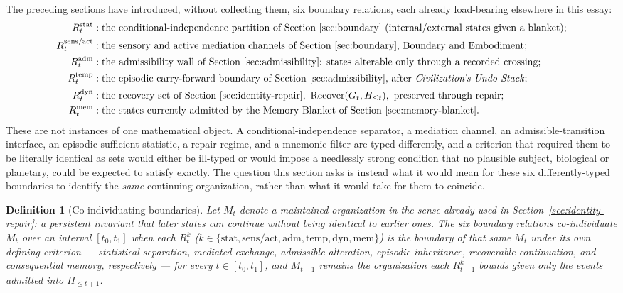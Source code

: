 \documentclass[11pt]{article}
\newcommand{\Recover}{\operatorname{Recover}}
\newtheorem{definition}{Definition}
\begin{document}
The preceding sections have introduced, without collecting them, six boundary relations, each already load-bearing elsewhere in this essay:
\begin{align*}
R^{\mathrm{stat}}_t &: \text{the conditional-independence partition of Section~\ref{sec:boundary} (internal/external states given a blanket);}\\
R^{\mathrm{sens/act}}_t &: \text{the sensory and active mediation channels of Section~\ref{sec:boundary}, Boundary and Embodiment;}\\
R^{\mathrm{adm}}_t &: \text{the admissibility wall of Section~\ref{sec:admissibility}: states alterable only through a recorded crossing;}\\
R^{\mathrm{temp}}_t &: \text{the episodic carry-forward boundary of Section~\ref{sec:admissibility}, after \emph{Civilization's Undo Stack};}\\
R^{\mathrm{dyn}}_t &: \text{the recovery set of Section~\ref{sec:identity-repair}, } \Recover(G_t,H_{\leq t}), \text{ preserved through repair;}\\
R^{\mathrm{mem}}_t &: \text{the states currently admitted by the Memory Blanket of Section~\ref{sec:memory-blanket}.}
\end{align*}
These are not instances of one mathematical object. A conditional-independence separator, a mediation channel, an admissible-transition interface, an episodic sufficient statistic, a repair regime, and a mnemonic filter are typed differently, and a criterion that required them to be literally identical as sets would either be ill-typed or would impose a needlessly strong condition that no plausible subject, biological or planetary, could be expected to satisfy exactly. The question this section asks is instead what it would mean for these six differently-typed boundaries to identify the \emph{same} continuing organization, rather than what it would take for them to coincide.

\begin{definition}[Co-individuating boundaries]
Let $M_t$ denote a maintained organization in the sense already used in Section~\ref{sec:identity-repair}: a persistent invariant that later states can continue without being identical to earlier ones. The six boundary relations \emph{co-individuate} $M_t$ over an interval $[t_0,t_1]$ when each $R^k_t$ ($k\in\{\mathrm{stat},\mathrm{sens/act},\mathrm{adm},\mathrm{temp},\mathrm{dyn},\mathrm{mem}\}$) is the boundary of that same $M_t$ under its own defining criterion --- statistical separation, mediated exchange, admissible alteration, episodic inheritance, recoverable continuation, and consequential memory, respectively --- for every $t\in[t_0,t_1]$, and $M_{t+1}$ remains the organization each $R^k_{t+1}$ bounds given only the events admitted into $H_{\leq t+1}$.
\end{definition}
\end{document}
